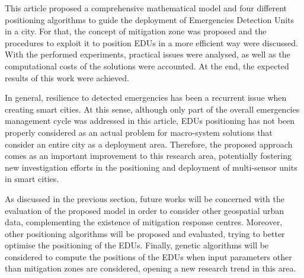 \begin{refsection}
This article proposed a comprehensive mathematical model and four different positioning algorithms to guide the deployment of Emergencies Detection Units in a city. For that, the concept of mitigation zone was proposed and the procedures to exploit it to position EDUs in a more efficient way were discussed. With the performed experiments, practical issues were analysed, as well as the computational costs of the solutions were accounted. At the end, the expected results of this work were achieved. 

In general, resilience to detected emergencies has been a recurrent issue when creating smart cities. At this sense, although only part of the overall emergencies management cycle was addressed in this article, EDUs positioning has not been properly considered as an actual problem for macro-system solutions that consider an entire city as a deployment area. Therefore, the proposed approach comes as an important improvement to this research area, potentially fostering new investigation efforts in the positioning and deployment of multi-sensor units in smart cities.

As discussed in the previous section, future works will be concerned with the evaluation of the proposed model in order to consider other geospatial urban data, complementing the existence of mitigation response centres. Moreover, other positioning algorithms will be proposed and evaluated, trying to better optimise the positioning of the EDUs. Finally, genetic algorithms will be considered to compute the positions of the EDUs when input parameters other than mitigation zones are considered, opening a new research trend in this area.



\printbibliography[heading=subbibliography]

\end{refsection}

